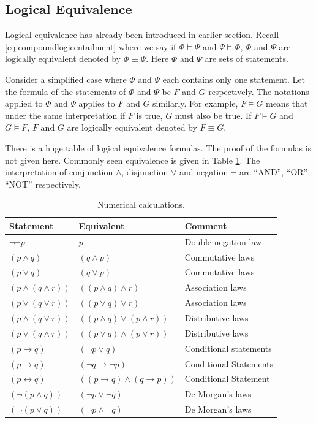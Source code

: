 \subsection{Logical Equivalence}

Logical equivalence has already been introduced in earlier section. Recall \eqref{eq:compoundlogicentailment} where we say if $\Phi \models \Psi$ and $\Psi \models \Phi$, $\Phi$ and $\Psi$ are logically equivalent denoted by $\Phi \equiv \Psi$. Here $\Phi$ and $\Psi$ are sets of statements.

Consider a simplified case where $\Phi$ and $\Psi$ each contains only one statement. Let the formula of the statements of $\Phi$ and $\Psi$ be $F$ and $G$ respectively. The notations applied to $\Phi$ and $\Psi$ applies to $F$ and $G$ similarly. For example, $F\models G$ means that under the same interpretation if $F$ is true, $G$ must also be true. If $F \models G$ and $G \models F$, $F$ and $G$ are logically equivalent denoted by $F\equiv G$.

There is a huge table of logical equivalence formulas. The proof of the formulas is not given here. Commonly seen equivalence is given in Table \ref{tab:logicalequivalence}. The interpretation of conjunction $\land$, disjunction $\lor$ and negation $\neg$ are ``AND'', ``OR'', ``NOT'' respectively.
\begin{table}
	\centering \caption{Numerical calculations.} \label{tab:logicalequivalence}
	\begin{tabularx}{\textwidth}{llX}
		\hline
		Statement & Equivalent & Comment \\
		\hline
		$\neg \neg p$ & $p$ & Double negation law \\
		$(p \land q)$ & $(q \land p)$ & Commutative laws \\
		$(p \lor q)$ & $(q \lor p)$ & Commutative laws \\
		$(p \land (q \land r))$ & $((p \land q) \land r)$ & Association laws \\
		$(p \lor (q \lor r))$ & $((p \lor q) \lor r)$ & Association laws \\
		$(p \land (q \lor r))$ & $((p \land q) \lor (p \land r))$ & Distributive laws \\
		$(p \lor (q \land r))$ & $((p \lor q) \land (p \lor r))$ & Distributive laws \\
		$(p \rightarrow q)$ & $(\neg p \lor q)$ & Conditional statements \\
		$(p \rightarrow q)$ & $(\neg q \rightarrow \neg p)$ & Conditional Statements \\
		$(p \leftrightarrow q)$ & $((p \rightarrow q) \land (q \rightarrow p))$ & Conditional Statement \\
		$(\neg (p \land q))$ & $(\neg p \lor \neg q)$ & De Morgan's laws \\
		$(\neg (p \lor q))$ & $(\neg p \land \neg q)$ & De Morgan's laws \\
		\hline
	\end{tabularx}
\end{table}

